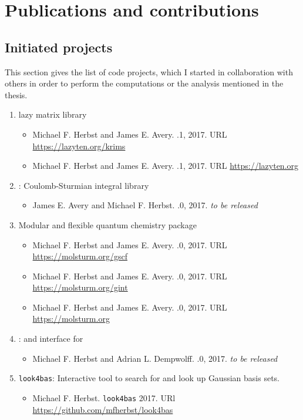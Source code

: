 \chapter*{Publications and contributions}

\section*{Initiated projects}
This section gives the list of code projects,
which I started in collaboration with others in order to perform
the computations or the analysis mentioned in the thesis.

\begin{enumerate}
	\item \lazyten lazy matrix library
		\begin{itemize}
			\item Michael F. Herbst and James E. Avery.
				.1, 2017. URL \url{https://lazyten.org/krims}
			\item Michael F. Herbst and James E. Avery.
				.1, 2017. URL \url{https://lazyten.org}
		\end{itemize}
	\item \sturmint: Coulomb-Sturmian integral library
		\begin{itemize}
			\item James E. Avery and Michael F. Herbst.
				.0, 2017. \textit{to be released}
		\end{itemize}
	\item \molsturm Modular and flexible quantum chemistry package
		\begin{itemize}
			\item Michael F. Herbst and James E. Avery.
				.0, 2017. URL \url{https://molsturm.org/gscf}
			\item Michael F. Herbst and James E. Avery.
				.0, 2017. URL \url{https://molsturm.org/gint}
			\item Michael F. Herbst and James E. Avery.
				.0, 2017. URL \url{https://molsturm.org}
		\end{itemize}
	\item \adcc: \python and \cpp interface for \adcman{}
		\begin{itemize}
		\item Michael F. Herbst and Adrian L. Dempwolff.
			.0, 2017. \textit{to be released}
		\end{itemize}
	\item \texttt{look4bas}: Interactive tool to search for and
			look up Gaussian basis sets.
		\begin{itemize}
		\item Michael F. Herbst. \texttt{look4bas} 2017. URl \url{https://github.com/mfherbst/look4bas}
		\end{itemize}
\end{enumerate}

